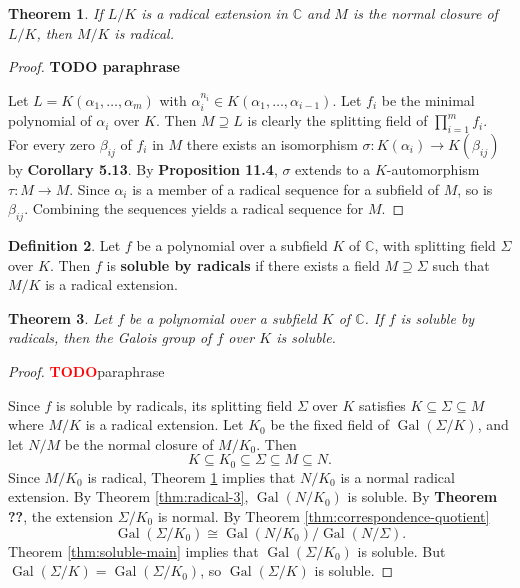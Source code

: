 \documentclass[12pt]{article}
\newtheorem{theorem}{Theorem}
\theoremstyle{definition}
\newtheorem{definition}[theorem]{Definition}
\newcommand{\Gal}{\operatorname{Gal}}
\newcommand{\TODO}{\textbf{\textcolor{red}{TODO}}}
\begin{document}
\begin{theorem} \label{thm:radical-closure}
    If $L / K$ is a radical extension in $\mathbb{C}$ and $M$ is the normal closure of $L / K$, then $M / K$ is radical.
\end{theorem}

\begin{proof}
\textbf{TODO paraphrase}

Let $L=K\left(\alpha_1, \ldots, \alpha_m\right)$ with $\alpha_i^{n_i} \in K\left(\alpha_1, \ldots, \alpha_{i-1}\right)$. Let $f_i$ be the minimal polynomial of $\alpha_i$ over $K$. Then $M \supseteq L$ is clearly the splitting field of $\prod_{i=1}^m f_i$. For every zero $\beta_{i j}$ of $f_i$ in $M$ there exists an isomorphism $\sigma : K\left(\alpha_i\right) \rightarrow K\left(\beta_{i j}\right)$ by \textbf{Corollary 5.13}. By \textbf{Proposition 11.4}, $\sigma$ extends to a $K$-automorphism $\tau: M \rightarrow M$. Since $\alpha_i$ is a member of a radical sequence for a subfield of $M$, so is $\beta_{i j}$. Combining the sequences yields a radical sequence for $M$.
\end{proof}


\begin{definition}
    Let $f$ be a polynomial over a subfield $K$ of $\mathbb{C}$, with splitting field $\Sigma$ over $K$. Then $f$ is \textbf{soluble by radicals} if there exists a field $M \supseteq \Sigma$ such that $M / K$ is a radical extension.  
\end{definition}



\begin{theorem} \label{thm:radical-galois-soluble}
    Let $f$ be a polynomial over a subfield $K$ of $\mathbb{C}$. If $f$ is soluble by radicals, then the Galois group of $f$ over $K$ is soluble.
\end{theorem}

\begin{proof}
\TODO paraphrase

Since $f$ is soluble by radicals, its splitting field $\Sigma$ over $K$ satisfies $K \subseteq \Sigma \subseteq M$ where $M / K$ is a radical extension. Let $K_0$ be the fixed field of $\Gal(\Sigma / K)$, and let $N / M$ be the normal closure of $M / K_0$. Then
$$
K \subseteq K_0 \subseteq \Sigma \subseteq M \subseteq N.
$$
Since $M / K_0$ is radical, Theorem \ref{thm:radical-closure} implies that $N / K_0$ is a normal radical extension. By Theorem \ref{thm:radical-3}, $\Gal\left(N / K_0\right)$ is soluble.
By \textbf{Theorem ??}, the extension $\Sigma / K_0$ is normal. By Theorem \ref{thm:correspondence-quotient}
$$
\Gal\left(\Sigma / K_0\right) \cong \Gal\left(N / K_0\right) / \Gal(N / \Sigma).
$$
Theorem \ref{thm:soluble-main} implies that $\Gal\left(\Sigma / K_0\right)$ is soluble. But $\Gal(\Sigma / K)=\Gal\left(\Sigma / K_0\right)$, so $\Gal(\Sigma / K)$ is soluble.

\end{proof}
\end{document}
